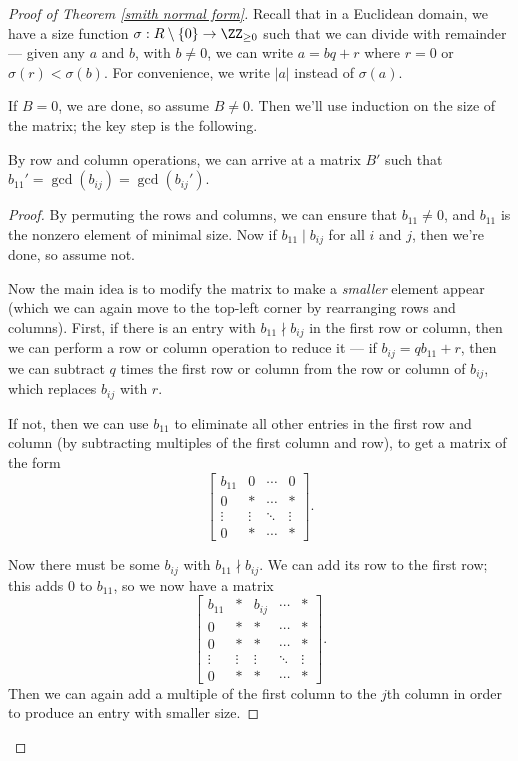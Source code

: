 \begin{proof}[Proof of Theorem \ref{smith normal form}]
Recall that in a Euclidean domain, we have a size function $\sigma : R \setminus \{0\} \to \ZZ_{\geq 0}$ such that we can divide with remainder --- given any $a$ and $b$, with $b \neq 0$, we can write $a = bq + r$ where $r = 0$ or $\sigma(r) < \sigma(b)$. For convenience, we write $|a|$ instead of $\sigma(a)$. 


If $B = 0$, we are done, so assume $B \neq 0$. Then we'll use induction on the size of the matrix; the key step is the following. 

\begin{lemma}\label{b prime gcd}
By row and column operations, we can arrive at a matrix $B'$ such that $b_{11}' = \gcd(b_{ij}) = \gcd(b_{ij}')$.
\end{lemma}

\begin{proof}
By permuting the rows and columns, we can ensure that $b_{11} \neq 0$, and $b_{11}$ is the nonzero element of minimal size. Now if $b_{11} \mid b_{ij}$ for all $i$ and $j$, then we're done, so assume not. 

Now the main idea is to modify the matrix to make a \emph{smaller} element appear (which we can again move to the top-left corner by rearranging rows and columns). 
First, if there is an entry with $b_{11} \nmid b_{ij}$ in the first row or column, then we can perform a row or column operation to reduce it --- if $b_{ij} = qb_{11} + r$, then we can subtract $q$ times the first row or column from the row or column of $b_{ij}$, which replaces $b_{ij}$ with $r$.

If not, then we can use $b_{11}$ to eliminate all other entries in the first row and column (by subtracting multiples of the first column and row), to get a matrix of the form \[\begin{bmatrix} b_{11} & 0 & \cdots & 0 \\ 0 & * & \cdots & * \\ \vdots & \vdots & \ddots & \vdots \\ 0 & * & \cdots & * \end{bmatrix}.\] 

Now there must be some $b_{ij}$ with $b_{11} \nmid b_{ij}$. We can add its row to the first row; this adds $0$ to $b_{11}$, so we now have a matrix \[\begin{bmatrix} b_{11} & * & b_{ij} & \cdots & * \\ 0 & * & * & \cdots & * \\ 0 & * & * & \cdots & * \\ \vdots & \vdots & \vdots & \ddots & \vdots \\ 0 & * & * & \cdots & * \end{bmatrix}.\] Then we can again add a multiple of the first column to the $j$th column in order to produce an entry with smaller size. 


\end{proof}
\end{proof}
